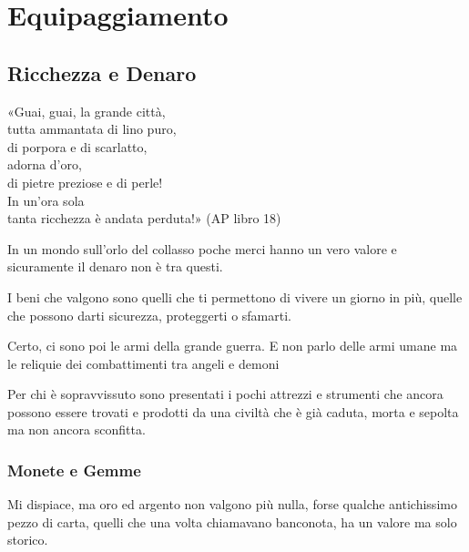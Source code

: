 \documentclass[12pt,a4paper,twoside,openany]{book}
\begin{document}
\pagebreak

\section{Equipaggiamento}\hypertarget{equipaggiamento}{}\label{equipaggiamento}

\begin{multicols}{2}

\subsection{Ricchezza e Denaro}


\begin{changemargin}{0.3cm}{0.3cm}\begin{enfasi}{
«Guai, guai, la grande città,\\
tutta ammantata di lino puro,\\
di porpora e di scarlatto,\\
adorna d’oro,\\
di pietre preziose e di perle!\\
In un’ora sola\\
tanta ricchezza è andata perduta!» (AP libro 18)
}\end{enfasi}\end{changemargin}

\label{ricchezza-e-denaro}

In un mondo sull'orlo del collasso poche merci hanno un vero valore e sicuramente il denaro non è tra questi.

I beni che valgono sono quelli che ti permettono di vivere un giorno in più, quelle che possono darti sicurezza, proteggerti o sfamarti.

Certo, ci sono poi le armi della grande guerra. E non parlo delle armi umane ma le reliquie dei combattimenti tra angeli e demoni

Per chi è sopravvissuto sono presentati i pochi attrezzi e strumenti che ancora possono essere trovati e prodotti da una civiltà che è già caduta, morta e sepolta ma non ancora sconfitta.

\subsubsection{Monete e Gemme}

Mi dispiace, ma oro ed argento non valgono più nulla, forse qualche antichissimo pezzo di carta, quelli che una volta chiamavano banconota, ha un valore ma solo storico.


\end{multicols}
\end{document}
